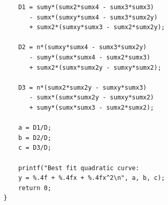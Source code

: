 \begin{verbatim}
    D1 = sumy*(sumx2*sumx4 - sumx3*sumx3)
       - sumx*(sumxy*sumx4 - sumx3*sumx2y)
       + sumx2*(sumxy*sumx3 - sumx2*sumx2y);

    D2 = n*(sumxy*sumx4 - sumx3*sumx2y)
       - sumy*(sumx*sumx4 - sumx2*sumx3)
       + sumx2*(sumx*sumx2y - sumxy*sumx2);

    D3 = n*(sumx2*sumx2y - sumxy*sumx3)
       - sumx*(sumx*sumx2y - sumxy*sumx2)
       + sumy*(sumx*sumx3 - sumx2*sumx2);

    a = D1/D;
    b = D2/D;
    c = D3/D;

    printf("Best fit quadratic curve: 
    y = %.4f + %.4fx + %.4fx^2\n", a, b, c);
    return 0;
}

\end{verbatim}